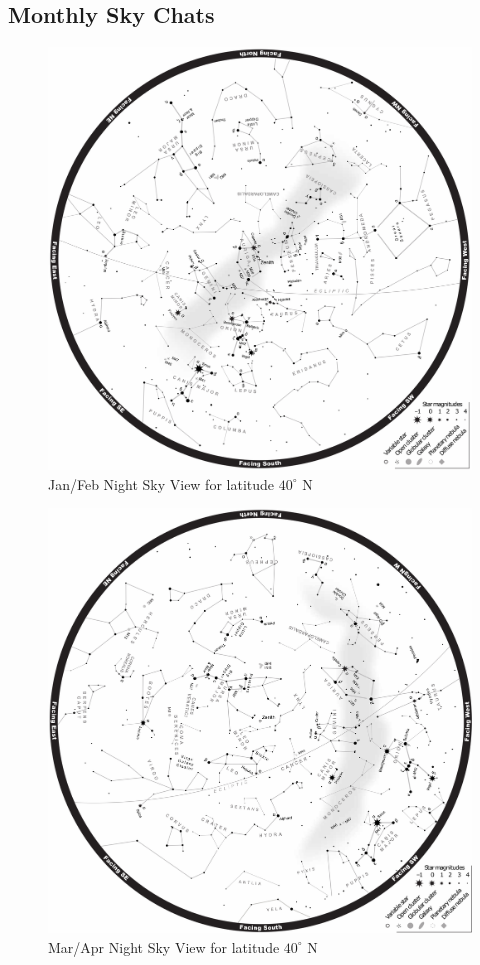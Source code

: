 \documentclass[a4paper,12pt]{extarticle}
\begin{document}
\subsection{Monthly Sky Chats}
\vspace{2cm}
\begin{figure}[H]
    \centering
    \includegraphics[width=0.9 \linewidth]{jan-feb.png}
    \caption{Jan/Feb Night Sky View for latitude $40^\circ$ N}
\end{figure}
\clearpage
\begin{figure}
    \centering
    \includegraphics[width=0.9 \linewidth]{mar-apr.png}
    \caption{Mar/Apr Night Sky View for latitude $40^\circ$ N}
\end{figure}
\end{document}
